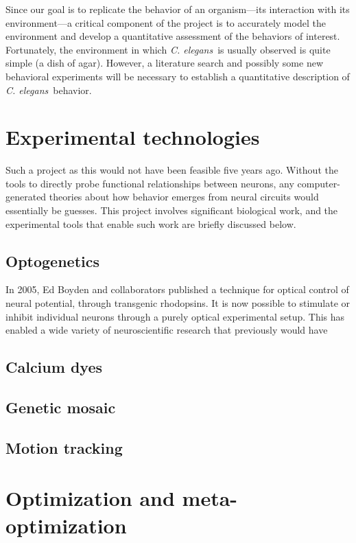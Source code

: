 \documentclass[letter,11pt]{article}
\newcommand{\cel}{{\em C. elegans}}
\begin{document}
Since our goal is to replicate the behavior of an organism---its interaction with
its environment---a critical component of the project is to accurately model the
environment and develop a quantitative assessment of the behaviors of interest.
Fortunately, the environment in which \cel\ is usually observed is quite simple
(a dish of agar). However, a literature search and possibly some new behavioral
experiments will be necessary to establish a quantitative description of \cel\ 
behavior.

\section*{Experimental technologies}

Such a project as this would not have been feasible five years ago. Without the
tools to directly probe functional relationships between neurons, any computer-
generated theories about how behavior emerges from neural circuits would
essentially be guesses. This project involves significant biological work, and
the experimental tools that enable such work are briefly discussed below.

\subsection*{Optogenetics}

In 2005, Ed Boyden and collaborators published a technique for optical control of
neural potential, through transgenic rhodopsins. It is now possible to stimulate
or inhibit individual neurons through a purely optical experimental setup. This
has enabled a wide variety of neuroscientific research that previously would have

\subsection*{Calcium dyes}

\subsection*{Genetic mosaic}

\subsection*{Motion tracking}

\section*{Optimization and meta-optimization}
\end{document}
